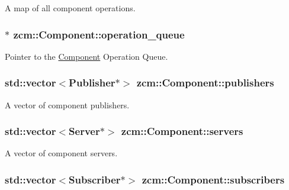 A map of all component operations. 

\hypertarget{classzcm_1_1Component_a4c9f3591c18dde89bc3c2af7717c6692}{
\subsubsection[{operation\-\_\-queue}]{$\ast$ zcm\-::\-Component\-::operation\-\_\-queue\hspace{0.3cm}{\ttfamily [protected]}}}\label{classzcm_1_1Component_a4c9f3591c18dde89bc3c2af7717c6692}


Pointer to the \hyperlink{classzcm_1_1Component}{Component} Operation Queue. 

\hypertarget{classzcm_1_1Component_a4dcce63b0b5495bc15bd18e5dce86094}{
\subsubsection[{publishers}]{\setlength{\rightskip}{0pt plus 5cm}std\-::vector$<${\bf Publisher}$\ast$$>$ zcm\-::\-Component\-::publishers\hspace{0.3cm}{\ttfamily [protected]}}}\label{classzcm_1_1Component_a4dcce63b0b5495bc15bd18e5dce86094}


A vector of component publishers. 

\hypertarget{classzcm_1_1Component_a1d99508f165f7014b190d2fbe4ad2271}{
\subsubsection[{servers}]{\setlength{\rightskip}{0pt plus 5cm}std\-::vector$<${\bf Server}$\ast$$>$ zcm\-::\-Component\-::servers\hspace{0.3cm}{\ttfamily [protected]}}}\label{classzcm_1_1Component_a1d99508f165f7014b190d2fbe4ad2271}


A vector of component servers. 

\hypertarget{classzcm_1_1Component_a9f9e58fb5d2189b183ffd22ce905d620}{
\subsubsection[{subscribers}]{\setlength{\rightskip}{0pt plus 5cm}std\-::vector$<${\bf Subscriber}$\ast$$>$ zcm\-::\-Component\-::subscribers\hspace{0.3cm}{\ttfamily [protected]}}}\label{classzcm_1_1Component_a9f9e58fb5d2189b183ffd22ce905d620}


